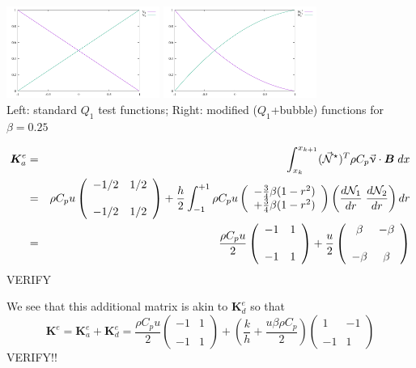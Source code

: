 \begin{center}
\includegraphics[width=5cm]{images/supg/bubble1}
\includegraphics[width=5cm]{images/supg/bubble2}\\
{\captionfont Left: standard $Q_1$ test functions; Right: modified ($Q_1$+bubble) functions
for $\beta=0.25$}
\end{center}


\begin{eqnarray}
{\bm K}_a^e 
&=& \int_{x_k}^{x_{k+1}}   ({\vec {{\mathcal{N}}}}^\star)^T \rho C_p \vec\upnu \cdot {\bm B} \; dx  \nonumber\\
&=& 
\rho C_p u
\left(
\begin{array}{cc}
-1/2 & 1/2 \\ \\
-1/2 & 1/2 
\end{array}
\right)
+
\frac{h}{2}
\int_{-1}^{+1}
\rho C_p u
\left(\begin{array}{c}
-\frac{3}{4}\beta(1-r^2) \\ +\frac{3}{4}\beta(1-r^2) 
\end{array}\right)
\left( \frac{d{\mathcal{N}}_1}{dr} \; \frac{d{\mathcal{N}}_2}{dr} \right)  dr \\
&=&
\frac{\rho C_p u}{2}
\left(
\begin{array}{cc}
-1 & 1 \\ \\
-1 & 1 
\end{array}
\right)
+
\frac{u}{2}
\left(
\begin{array}{cc}
\beta & -\beta \\ \\
-\beta & \beta
\end{array}
\right)
\end{eqnarray}
VERIFY

We see that this additional matrix is akin to ${\bm K}_d^e$
so that 
\[
{\bm K}^e 
= {\bm K}_a^e + {\bm K}_d^e 
= \frac{\rho C_p u}{2}
\left(
\begin{array}{cc}
-1 & 1 \\ \\
-1 & 1 
\end{array}
\right)
+
(\frac{k}{h} + \frac{u \beta \rho C_p}{2})
\left(
\begin{array}{cc}
1 & -1 \\ \\
-1 & 1 
\end{array}
\right)
\]
VERIFY!!


